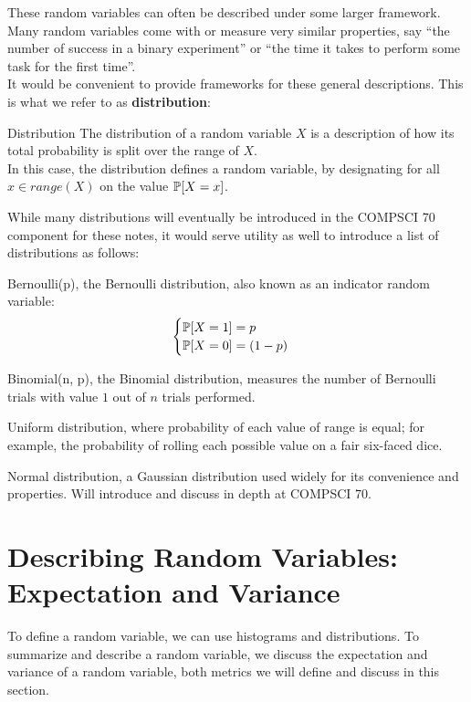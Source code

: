 These random variables can often be described under some larger framework. Many random variables come with or measure very similar properties, say ``the number of success in a binary experiment'' or ``the time it takes to perform some task for the first time''. \\
It would be convenient to provide frameworks for these general descriptions. This is what we refer to as \textbf{distribution}:
\begin{ln-define}{Distribution}{}
    The distribution of a random variable $X$ is a description of how its total probability is split over the range of $X$. \\
    In this case, the distribution defines a random variable, by designating for all $x \in range(X)$ on the value $\P[X = x]$.
\end{ln-define}
While many distributions will eventually be introduced in the COMPSCI 70 component for these notes, it would serve utility as well to introduce a list of distributions as follows:
\begin{bindenum}
    \item {
        Bernoulli(p), the Bernoulli distribution, also known as an indicator random variable:
        \[
            \begin{cases}
                \P[X = 1] = p \\
                \P[X = 0] = (1 - p)
            \end{cases}
        \]
    }
    \item {
        Binomial(n, p), the Binomial distribution, measures the number of Bernoulli trials with value $1$ out of $n$ trials performed.
    }
    \item {
        Uniform distribution, where probability of each value of range is equal; for example, the probability of rolling each possible value on a fair six-faced dice.
    }
    \item {
        Normal distribution, a Gaussian distribution used widely for its convenience and properties. Will introduce and discuss in depth at COMPSCI 70.
    }
\end{bindenum}

\section{Describing Random Variables: Expectation and Variance}
To define a random variable, we can use histograms and distributions. To summarize and describe a random variable, we discuss the expectation and variance of a random variable, both metrics we will define and discuss in this section.

